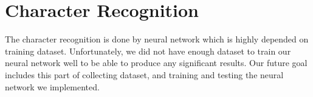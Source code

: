 \documentclass{standalone}
\begin{document}
\section{Character Recognition}
The character recognition is done by neural network which is highly depended on training dataset. Unfortunately, we did not have enough dataset to train our neural network well to be able to produce any significant results. Our future goal includes this part of collecting dataset, and training and testing the neural network we implemented.
\end{document}
